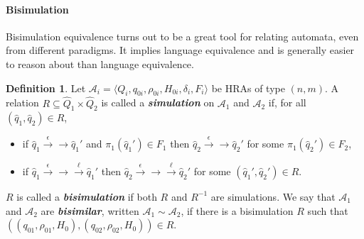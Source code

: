 \documentclass{article}
\theoremstyle{definition}
\newtheorem{remark}[theorem]{Remark}
\newtheorem{definition}[theorem]{Definition}
\newcommand\boldemph[1]{\emph{\textbf{#1}}}
\renewcommand\AA{\mathcal{A}}
\newcommand\trdelta[2][]{\overset{#2}\longrightarrow}
\newcommand\trdeltaa[2][]{\overset{#2}\longrightarrow\!\!\!\!\!\!\!\!\!\longrightarrow}
\newcommand\ta{,}
\begin{document}

\paragraph{Bisimulation}
Bisimulation equivalence turns out to be a great tool for relating automata, even from different paradigms. It implies language equivalence and is generally easier to reason about than language equivalence.

\begin{definition}\label{d:bisim}
Let $\AA_i=\langle Q_i,q_{0i},\rho_{0i},H_{0i},\delta_i,F_i\rangle$ be HRAs of type $(n,m)$. A relation $R\subseteq\hat Q_1\times\hat Q_2$ is called a \boldemph{simulation} on $\AA_1$ and $\AA_2$ if, for all $(\hat{q}_1,\hat{q}_2)\in R$,
\begin{itemize}
\item if $\hat q_1\trdeltaa[\delta_2]{\epsilon}\hat q_1'$ and $\pi_1(\hat q_1')\in F_1$ then $\hat q_2\trdeltaa[\delta_2]{\epsilon}\hat q_2'$ for some $\pi_1(\hat q_2')\in F_2$,
\item if $\hat q_1\trdeltaa{\epsilon}\trdelta[\delta_1]{\ell}\hat q_1'$ then $\hat q_2\trdeltaa{\epsilon}\trdelta[\delta_2]{\ell}\hat q_2'$ for some $(\hat q_1',\hat q_2')\in R$.
\end{itemize}
$R$ is called a \boldemph{bisimulation} if both $R$ and $R^{-1}$ are simulations.
We say that $\AA_1$ and $\AA_2$ are \boldemph{bisimilar}, written $\AA_1\sim\AA_2$, if there is a bisimulation $R$ such that $((q_{01},\rho_{01},H_0),(q_{02},\rho_{02},H_0))\in R$.
\end{definition}
\end{document}

